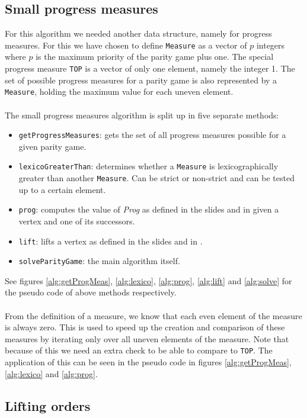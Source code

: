 \documentclass[10pt,a4paper]{article}
\begin{document}
\subsection{Small progress measures}
For this algorithm we needed another data structure, namely for progress measures. For this we have chosen to define \verb|Measure| as a vector of $p$ integers where $p$ is the maximum priority of the parity game plus one. The special progress measure \verb|TOP| is a vector of only one element, namely the integer 1. The set of possible progress measures for a parity game is also represented by a \verb|Measure|, holding the maximum value for each uneven element.
\\\\
The small progress measures algorithm is split up in five separate methods:
\begin{itemize}
\item \verb|getProgressMeasures|: gets the set of all progress measures possible for a given parity game.
\item \verb|lexicoGreaterThan|: determines whether a \verb|Measure| is lexicographically greater than another \verb|Measure|. Can be strict or non-strict and can be tested up to a certain element.
\item \verb|prog|: computes the value of \textit{Prog} as defined in the slides and in \cite{spmpaper} given a vertex and one of its successors.
\item \verb|lift|: lifts a vertex as defined in the slides and in \cite{spmpaper}.
\item \verb|solveParityGame|: the main algorithm itself.
\end{itemize}
See figures \ref{alg:getProgMeas}, \ref{alg:lexico}, \ref{alg:prog}, \ref{alg:lift} and \ref{alg:solve} for the pseudo code of above methods respectively.
\\\\
From the definition of a measure, we know that each even element of the measure is always zero. This is used to speed up the creation and comparison of these measures by iterating only over all uneven elements of the measure. Note that because of this we need an extra check to be able to compare to \verb|TOP|. The application of this can be seen in the pseudo code in figures \ref{alg:getProgMeas}, \ref{alg:lexico} and \ref{alg:prog}.

\subsection{Lifting orders}
\end{document}
